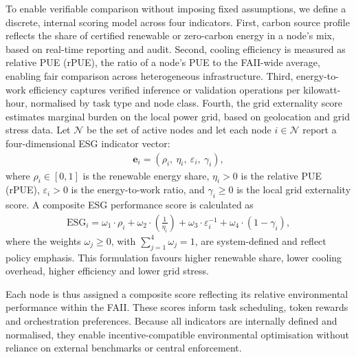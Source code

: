 \documentclass[oneside,10pt]{swissi}
\begin{document}
To enable verifiable comparison without imposing fixed assumptions, we define a discrete, internal scoring model across four indicators. First, carbon source profile reflects the share of certified renewable or zero-carbon energy in a node’s mix, based on real-time reporting and audit. Second, cooling efficiency is measured as relative PUE (rPUE), the ratio of a node’s PUE to the FAII-wide average, enabling fair comparison across heterogeneous infrastructure. Third, energy-to-work efficiency captures verified inference or validation operations per kilowatt-hour, normalised by task type and node class. Fourth, the grid externality score estimates marginal burden on the local power grid, based on geolocation and grid stress data. Let \( \mathcal{N} \) be the set of active nodes and let each node \( i \in \mathcal{N} \) report a four-dimensional ESG indicator vector:
\begin{align}
\mathbf{e}_i = \left( \rho_i,\ \eta_i,\ \varepsilon_i,\ \gamma_i \right),
\end{align}
where \( \rho_i \in [0,1] \) is the renewable energy share, \( \eta_i > 0 \) is the relative PUE (rPUE), \( \varepsilon_i > 0 \) is the energy-to-work ratio, and \( \gamma_i \ge 0 \) is the local grid externality score. A composite ESG performance score is calculated as
\begin{align}
\text{ESG}_i = \omega_1 \cdot \rho_i + \omega_2 \cdot \left( \frac{1}{\eta_i} \right) + \omega_3 \cdot \varepsilon_i^{-1} + \omega_4 \cdot (1 - \gamma_i),
\end{align}
where the weights \( \omega_j \ge 0 \), with \( \sum_{j=1}^4 \omega_j = 1 \), are system-defined and reflect policy emphasis. This formulation favours higher renewable share, lower cooling overhead, higher efficiency and lower grid stress.

Each node is thus assigned a composite score reflecting its relative environmental performance within the FAII. These scores inform task scheduling, token rewards and orchestration preferences. Because all indicators are internally defined and normalised, they enable incentive-compatible environmental optimisation without reliance on external benchmarks or central enforcement.
\end{document}
